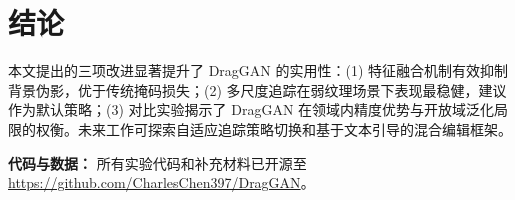 \documentclass[a4paper,10pt]{ctexart}
\begin{document}
\section{结论}
本文提出的三项改进显著提升了 DragGAN 的实用性：(1) 特征融合机制有效抑制背景伪影，优于传统掩码损失；(2) 多尺度追踪在弱纹理场景下表现最稳健，建议作为默认策略；(3) 对比实验揭示了 DragGAN 在领域内精度优势与开放域泛化局限的权衡。未来工作可探索自适应追踪策略切换和基于文本引导的混合编辑框架。

\textbf{代码与数据：} 所有实验代码和补充材料已开源至 \url{https://github.com/CharlesChen397/DragGAN}。
\end{document}
